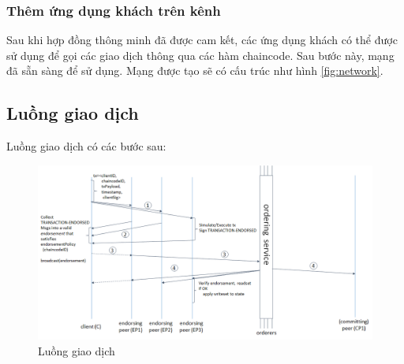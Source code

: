 \subsubsection{Thêm ứng dụng khách trên kênh}

Sau khi hợp đồng thông minh đã được cam kết, các ứng dụng khách có thể được sử dụng để gọi 
các giao dịch thông qua các hàm chaincode. Sau bước này, mạng đã sẵn sàng để sử dụng.
Mạng được tạo sẽ có cấu trúc như hình \ref{fig:network}.

\subsection{Luồng giao dịch}
\label{subsec:luonggiaodich}
Luồng giao dịch có các bước sau:
\begin{figure}[h]
    \centering
    \includegraphics[width=1\textwidth]{images/flow-4.png}
    \caption{Luồng giao dịch }
\end{figure}


